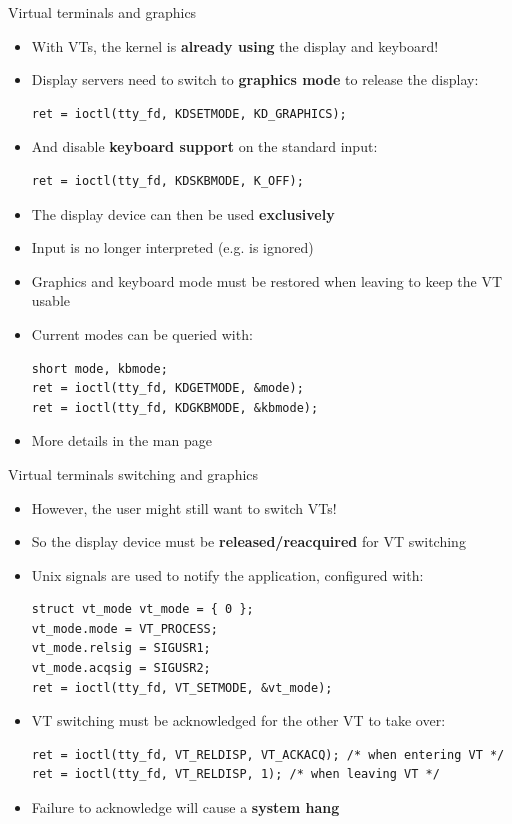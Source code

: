 \begin{frame}[fragile]{Virtual terminals and graphics}
  \begin{itemize}
  \item With VTs, the kernel is \textbf{already using} the display and keyboard!
  \item Display servers need to switch to \textbf{graphics mode} to release the display:
  \begin{verbatim}
ret = ioctl(tty_fd, KDSETMODE, KD_GRAPHICS);
  \end{verbatim}
  \item And disable \textbf{keyboard support} on the standard input:
  \begin{verbatim}
ret = ioctl(tty_fd, KDSKBMODE, K_OFF);
  \end{verbatim}
  \item The display device can then be used \textbf{exclusively}
  \item Input is no longer interpreted (e.g.  is ignored)
  \item Graphics and keyboard mode must be restored when leaving to keep the VT usable
  \item Current modes can be queried with:
  \begin{verbatim}
short mode, kbmode;
ret = ioctl(tty_fd, KDGETMODE, &mode);
ret = ioctl(tty_fd, KDGKBMODE, &kbmode);
  \end{verbatim}
  \item More details in the  man page
  \end{itemize}
\end{frame}

\begin{frame}[fragile]{Virtual terminals switching and graphics}
  \begin{itemize}
  \item However, the user might still want to switch VTs!
  \item So the display device must be \textbf{released/reacquired} for VT switching
  \item Unix signals are used to notify the application, configured with:
  \begin{verbatim}
struct vt_mode vt_mode = { 0 };
vt_mode.mode = VT_PROCESS;
vt_mode.relsig = SIGUSR1;
vt_mode.acqsig = SIGUSR2;
ret = ioctl(tty_fd, VT_SETMODE, &vt_mode);
  \end{verbatim}
  \item VT switching must be acknowledged for the other VT to take over:
  \begin{verbatim}
ret = ioctl(tty_fd, VT_RELDISP, VT_ACKACQ); /* when entering VT */
ret = ioctl(tty_fd, VT_RELDISP, 1); /* when leaving VT */
  \end{verbatim}
  \item Failure to acknowledge will cause a \textbf{system hang}
  \end{itemize}
\end{frame}

